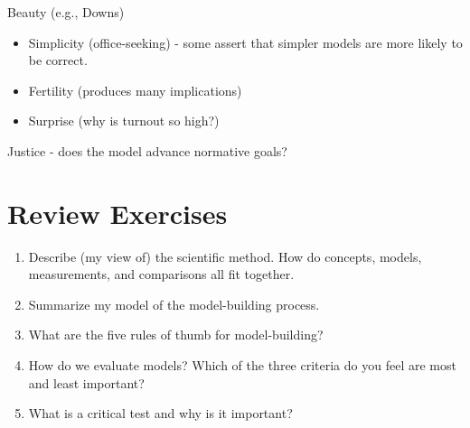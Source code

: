 \documentclass[]{book}
\providecommand{\tightlist}{%
  \setlength{\itemsep}{0pt}\setlength{\parskip}{0pt}}
\theoremstyle{definition}
\theoremstyle{definition}
\theoremstyle{definition}
\theoremstyle{remark}
\begin{document}
Beauty (e.g., Downs)

\begin{itemize}
\tightlist
\item
  Simplicity (office-seeking) - some assert that simpler models are more
  likely to be correct.
\item
  Fertility (produces many implications)
\item
  Surprise (why is turnout so high?)
\end{itemize}

Justice - does the model advance normative goals?

\section{Review Exercises}\label{review-exercises}

\begin{enumerate}
\def\labelenumi{\arabic{enumi}.}
\tightlist
\item
  Describe (my view of) the scientific method. How do concepts, models,
  measurements, and comparisons all fit together.
\item
  Summarize my model of the model-building process.
\item
  What are the five rules of thumb for model-building?
\item
  How do we evaluate models? Which of the three criteria do you feel are
  most and least important?
\item
  What is a critical test and why is it important?
\end{enumerate}


\end{document}
